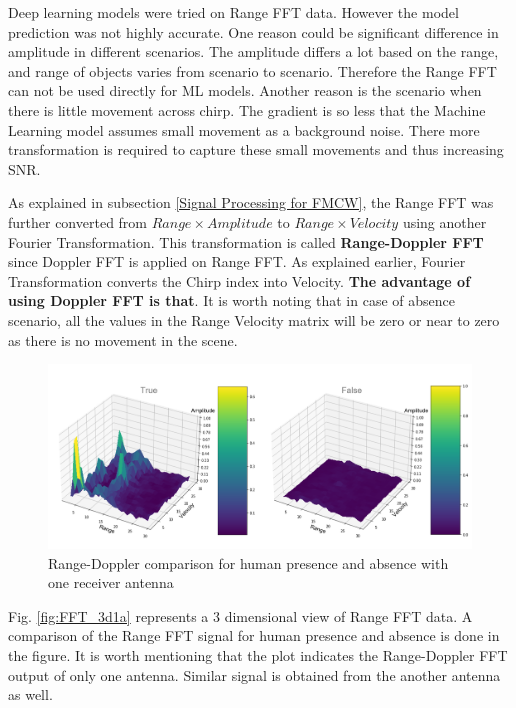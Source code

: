 Deep learning models were tried on Range FFT data. However the model prediction was not highly accurate. One reason could be significant difference in amplitude in different scenarios. The amplitude differs a lot based on the range, and range of objects varies from scenario to scenario. Therefore the Range FFT can not be used directly for ML models. Another reason is the scenario when there is little movement across chirp. The gradient is so less that the Machine Learning model assumes small movement as a background noise. There more transformation is required to capture these small movements and thus increasing SNR.


As explained in subsection \ref{Signal Processing for FMCW}, the Range FFT was further converted from $Range\times Amplitude$ to $Range\times Velocity$ using another Fourier Transformation. This transformation is called \textbf{Range-Doppler FFT} since Doppler FFT is applied on Range FFT. As explained earlier, Fourier Transformation converts the Chirp index into Velocity. \textbf{The advantage of using Doppler FFT is that}. It is worth noting that in case of absence scenario, all the values in the Range Velocity matrix will be zero or near to zero as there is no movement in the scene.
\begin{figure}[ht]
  \begin{center}
    \includegraphics[width=1\textwidth]{Master's thesis/images/range_doppler_fft.PNG} 
    \caption{Range-Doppler comparison for human presence  and  absence  with one receiver antenna}
    \label{fig:rdFFT_3d1a}
  \end{center}
\end{figure} 
Fig. \ref{fig:FFT_3d1a} represents a 3 dimensional view of Range FFT data. A comparison of the Range FFT signal for human presence and absence is done in the figure. It is worth mentioning that the plot indicates the Range-Doppler FFT output of only one antenna. Similar signal is obtained from the another antenna as well. 
